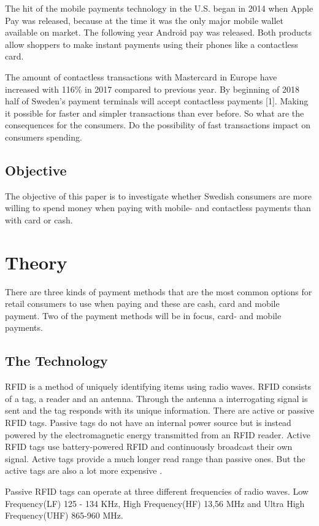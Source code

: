 \documentclass[runningheads,a4paper,oribibl]{llncs}
\begin{document}
The hit of the mobile payments technology in the U.S. began in 2014 when Apple Pay was released, because at the time it was the only major mobile wallet available on market.
The following year Android pay was released. Both products allow shoppers to make instant payments using their phones like a contactless card.

The amount of contactless transactions with Mastercard in Europe have increased with 116\% in 2017 compared to previous year.  By beginning of 2018 half of Sweden's payment terminals will accept contactless payments [1]. Making it possible for faster and simpler transactions than ever before. So what are the consequences for the consumers. Do the possibility of fast transactions impact on consumers spending.


\subsection{Objective}
The objective of this paper is to investigate whether Swedish consumers are more willing to spend money when paying with mobile- and contactless payments than with card or cash. 

\section{Theory}

There are three kinds of payment methods that are the most common options for retail consumers to use when paying and these are cash, card and mobile payment. Two of the payment methods will be in focus, card- and mobile payments.

\subsection{The Technology}

RFID is a method of uniquely identifying items using radio waves. RFID consists of a tag, a reader and an antenna. Through the antenna a interrogating signal is sent and the tag responds with its unique information. There are active or passive RFID tags. Passive tags do not have an internal power source but is instead powered by the electromagnetic energy transmitted from an RFID reader. Active RFID tags use battery-powered RFID and continuously broadcast their own signal. Active tags provide a much longer read range than passive ones. But the active tags are also a lot more expensive \cite{nfc}.

Passive RFID tags can operate at three different frequencies of radio waves. Low Frequency(LF) 125 - 134 KHz, High Frequency(HF) 13,56 MHz and Ultra High Frequency(UHF) 865-960 MHz.
\end{document}
